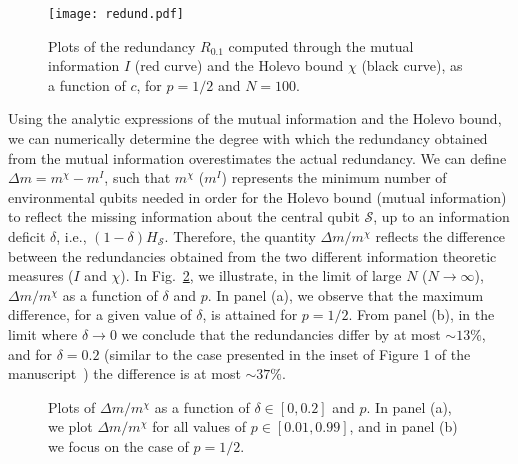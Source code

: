 \documentclass[aps,prl,showpacs,amsmath,amssymb,amsfonts,lengthcheck,onecolumn,longbibliography,superscriptaddress]{revtex4-2}
\newcommand{\+}         {\dagger}
\newcommand{\mc}[1]{\mathcal{#1}}
\begin{document}
\begin{figure}
	\texttt{[image: redund.pdf]}
	\caption{\label{Red}Plots of the redundancy $R_{0.1}$ computed through the mutual information $I$ (red curve) and the Holevo bound $\chi$ (black curve), as a function of $c$, for $p=1/2$ and $N=100$.}
\end{figure}

Using the analytic expressions of the mutual information and the Holevo bound, we can numerically determine the degree with which the redundancy obtained from the mutual information overestimates the actual redundancy. We can define $\Delta m= m^{\chi}-m^{I}$, such that $m^{\chi}$ ($m^{I}$) represents the minimum number of environmental qubits needed in order for the Holevo bound (mutual information) to reflect the missing information about the central qubit $\mc{S}$, up to an information deficit $\delta$, i.e., $(1-\delta)H_{\mc{S}}$. Therefore, the quantity $\Delta m/m^{\chi}$ reflects the difference between the redundancies obtained from the two different information theoretic measures ($I$ and $\chi$). In Fig.~\ref{deltam2}, we illustrate, in the limit of large $N$ ($N \rightarrow \infty$), $\Delta m/m^{\chi}$ as a function of $\delta$ and $p$. In panel (a), we observe that the maximum difference, for a given value of $\delta$, is attained for $p=1/2$. From panel (b), in the limit where $\delta \rightarrow 0$ we conclude that the redundancies differ by at most $\sim 13\%$, and for $\delta=0.2$ (similar to the case presented in the inset of Figure 1 of the manuscript~\cite{darwint1}) the difference is at most $\sim 37\%$.
\begin{figure}[h!]
	\centering
	\caption[]{\label{deltam2}Plots of $\Delta m /m^{\chi}$ as a function of $\delta \in [0,0.2]$ and $p$. In panel (a), we plot $\Delta m /m^{\chi}$ for all values of $p \in [0.01,0.99]$, and in panel (b) we focus on the case of $p=1/2$.}
\end{figure}
\end{document}
